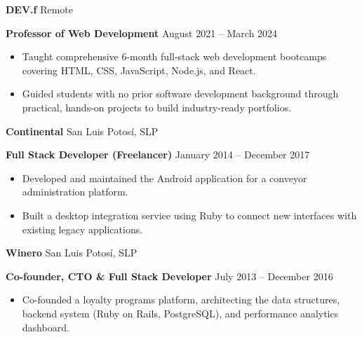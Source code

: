 \documentclass[11pt]{article}
\begin{document}
\vspace{8pt}

\textbf{DEV.f} \hfill Remote

\textbf{Professor of Web Development} \hfill August 2021 – March 2024
\begin{itemize}[noitemsep, topsep=0pt, partopsep=0pt, parsep=0pt]
    \item Taught comprehensive 6-month full-stack web development bootcamps covering HTML, CSS, JavaScript, Node.js, and React.
    \item Guided students with no prior software development background through practical, hands-on projects to build industry-ready portfolios.
\end{itemize}

\vspace{8pt}

\textbf{Continental} \hfill San Luis Potosí, SLP

\textbf{Full Stack Developer (Freelancer)} \hfill January 2014 – December 2017
\begin{itemize}[noitemsep, topsep=0pt, partopsep=0pt, parsep=0pt]
    \item Developed and maintained the Android application for a conveyor administration platform.
    \item Built a desktop integration service using Ruby to connect new interfaces with existing legacy applications.
\end{itemize}

\vspace{8pt}

\textbf{Winero} \hfill San Luis Potosí, SLP

\textbf{Co-founder, CTO \& Full Stack Developer} \hfill July 2013 – December 2016
\begin{itemize}[noitemsep, topsep=0pt, partopsep=0pt, parsep=0pt]
    \item Co-founded a loyalty programs platform, architecting the data structures, backend system (Ruby on Rails, PostgreSQL), and performance analytics dashboard.
\end{itemize}

\vspace{12pt}
\end{document}
